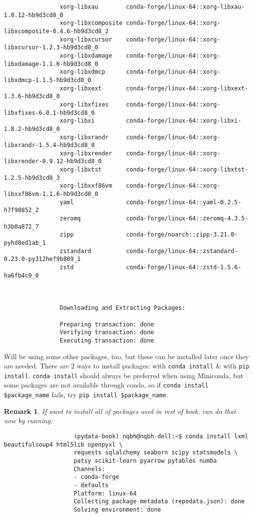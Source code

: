 \documentclass{article}
\newtheorem{remark}{Remark}
\begin{document}
\begin{itemize}
\begin{itemize}
\begin{itemize}
\begin{verbatim}
				xorg-libxau        conda-forge/linux-64::xorg-libxau-1.0.12-hb9d3cd8_0 
				xorg-libxcomposite conda-forge/linux-64::xorg-libxcomposite-0.4.6-hb9d3cd8_2 
				xorg-libxcursor    conda-forge/linux-64::xorg-libxcursor-1.2.3-hb9d3cd8_0 
				xorg-libxdamage    conda-forge/linux-64::xorg-libxdamage-1.1.6-hb9d3cd8_0 
				xorg-libxdmcp      conda-forge/linux-64::xorg-libxdmcp-1.1.5-hb9d3cd8_0 
				xorg-libxext       conda-forge/linux-64::xorg-libxext-1.3.6-hb9d3cd8_0 
				xorg-libxfixes     conda-forge/linux-64::xorg-libxfixes-6.0.1-hb9d3cd8_0 
				xorg-libxi         conda-forge/linux-64::xorg-libxi-1.8.2-hb9d3cd8_0 
				xorg-libxrandr     conda-forge/linux-64::xorg-libxrandr-1.5.4-hb9d3cd8_0 
				xorg-libxrender    conda-forge/linux-64::xorg-libxrender-0.9.12-hb9d3cd8_0 
				xorg-libxtst       conda-forge/linux-64::xorg-libxtst-1.2.5-hb9d3cd8_3 
				xorg-libxxf86vm    conda-forge/linux-64::xorg-libxxf86vm-1.1.6-hb9d3cd8_0 
				yaml               conda-forge/linux-64::yaml-0.2.5-h7f98852_2 
				zeromq             conda-forge/linux-64::zeromq-4.3.5-h3b0a872_7 
				zipp               conda-forge/noarch::zipp-3.21.0-pyhd8ed1ab_1 
				zstandard          conda-forge/linux-64::zstandard-0.23.0-py312hef9b889_1 
				zstd               conda-forge/linux-64::zstd-1.5.6-ha6fb4c9_0 
				
				
				
				Downloading and Extracting Packages:
				
				Preparing transaction: done                                                     
				Verifying transaction: done                                                     
				Executing transaction: done
			\end{verbatim}
			Will be using some other packages, too, but these can be installed later once they are needed. There are 2 ways to install packages: with {\tt conda install} \& with {\tt pip install}. {\tt conda install} should always be preferred when using Miniconda, but some packages are not available through conda, so if \verb|conda install $package_name| fails, try \verb|pip install $package_name|.				
			\begin{remark}
				If want to install all of packages used in rest of book, can do that now by running:
				\begin{verbatim}
					(pydata-book) nqbh@nqbh-dell:~$ conda install lxml beautifulsoup4 html5lib openpyxl \
					requests sqlalchemy seaborn scipy statsmodels \
					patsy scikit-learn pyarrow pytables numba
					Channels:                                                                       
					- conda-forge                                                                  
					- defaults                                                                     
					Platform: linux-64                                                              
					Collecting package metadata (repodata.json): done                               
					Solving environment: done                                                       
					

\end{verbatim}
\end{remark}
\end{itemize}
\end{itemize}
\end{itemize}
\end{document}

